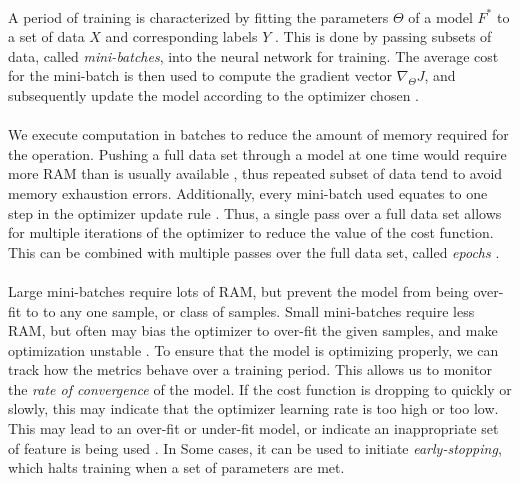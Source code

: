 \documentclass[12pt,letterpaper]{article}
\begin{document}
\paragraph*{}A period of training is characterized by fitting the parameters $\Theta$ of a model $F^*$ to a set of data $X$ and corresponding labels $Y$ \cite{Goodfellow,Virtanen}. This is done by passing subsets of data, called \textit{mini-batches}, into the neural network for training. The average cost for the mini-batch is then used to compute the gradient vector $\nabla_{\Theta}J$, and subsequently update the model according to the optimizer chosen \cite{Geron,Goodfellow}. 

\paragraph{}We execute computation in batches to reduce the amount of memory required for the operation. Pushing a full data set through a model at one time would require more RAM than is usually available , thus repeated subset of data tend to avoid memory exhaustion errors. Additionally, every mini-batch used equates to one step in the optimizer update rule \cite{Goodfellow}. Thus, a single pass over a full data set allows for multiple iterations of the optimizer to reduce the value of the cost function. This can be combined with multiple passes over the full data set, called \textit{epochs} \cite{James,Loy}.

\paragraph*{}Large mini-batches require lots of RAM, but prevent the model from being over-fit to to any one sample, or class of samples. Small mini-batches require less RAM, but often may bias the optimizer to over-fit the given samples, and make optimization unstable \cite{Geron,James}. To ensure that the model is optimizing properly, we can track how the metrics behave over a training period. This allows us to monitor the \textit{rate of convergence} of the model. If the cost function is dropping to quickly or slowly, this may indicate that the optimizer learning rate is too high or too low. This may lead to an over-fit or under-fit model, or indicate an inappropriate set of feature is being used \cite{Geron,Goodfellow}. In Some cases, it can be used to initiate \textit{early-stopping}, which halts training when a set of parameters are met. 
\end{document}
